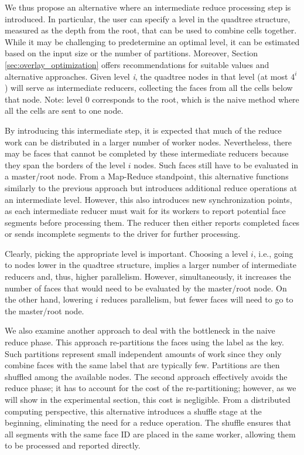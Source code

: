 We thus propose an alternative where an intermediate reduce processing step is introduced. In particular, the user can specify a level in the quadtree structure, measured as the depth from the root, that can be used to combine cells together. 
While it may be challenging to predetermine an optimal level, it can be estimated based on the input size or the number of partitions. Moreover, Section \ref{sec:overlay_optimization} offers recommendations for suitable values and alternative approaches.
Given level \textit{i}, the quadtree nodes in that level (at most $4^i$) will serve as intermediate reducers, collecting the faces from all the cells below that node. Note: level 0 corresponds to the root, which is the naive method where all the cells are sent to one node.

By introducing this intermediate step, it is expected that much of the reduce work can be distributed in a larger number of worker nodes. Nevertheless, there may be faces that cannot be completed by these intermediate reducers because they span the borders of the level $i$ nodes. Such faces still have to be evaluated in a master/root node.
From a Map-Reduce standpoint, this alternative functions similarly to the previous approach but introduces additional reduce operations at an intermediate level. However, this also introduces new synchronization points, as each intermediate reducer must wait for its workers to report potential face segments before processing them. The reducer then either reports completed faces or sends incomplete segments to the driver for further processing.

Clearly, picking the appropriate level is important. Choosing a level $i$, i.e., going to nodes lower in the quadtree structure, implies a larger number of intermediate reducers and, thus, higher parallelism. However, simultaneously, it increases the number of faces that would need to be evaluated by the master/root node. On the other hand, lowering $i$ reduces parallelism, but fewer faces will need to go to the master/root node.

We also examine another approach to deal with the bottleneck in the naive reduce phase. This approach re-partitions the faces using the label as the key. Such partitions represent small independent amounts of work since they only combine faces with the same label that are typically few. Partitions are then shuffled among the available nodes. The second approach effectively avoids the reduce phase; it has to account for the cost of the re-partitioning; however, as we will show in the experimental section, this cost is negligible.
From a distributed computing perspective, this alternative introduces a shuffle stage at the beginning, eliminating the need for a reduce operation. The shuffle ensures that all segments with the same face ID are placed in the same worker, allowing them to be processed and reported directly.

